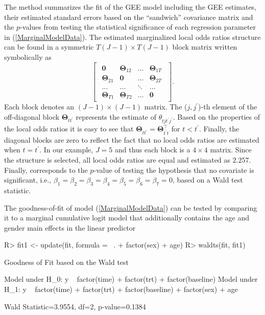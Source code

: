 \documentclass[
]{jss}
\begin{document}
The  method summarizes the fit of the GEE model including
the GEE estimates, their estimated standard errors based on the
``sandwich'' covariance matrix and the \(p\)-values from testing the
statistical significance of each regression parameter in
(\ref{MarginalModelData}). The estimated marginalized local odds ratios
structure can be found in a symmetric \(T(J-1) \times T(J-1)\) block
matrix written symbolically as \[\begin{bmatrix}
\begin{array}{cccc}
\mathbf 0                               &\boldsymbol{\Theta}_{12}                 &\ldots  &\boldsymbol{\Theta}_{1T} \\
\boldsymbol{\Theta}_{21}       &\mathbf 0                                &\ldots  &\boldsymbol{\Theta}_{2T} \\
\ldots                                  &\ldots                                   &\ddots  & \ldots          \\
\boldsymbol{\Theta}_{T1}       &\boldsymbol{\Theta}_{T2}        &\ldots  &\mathbf 0
\end{array}
\end{bmatrix}.\] Each block denotes an \((J-1) \times (J-1)\) matrix.
The (\(j,j^{\prime}\))-th element of the off-diagonal block
\(\boldsymbol{\Theta}_{tt^{\prime}}\) represents the estimate of
\(\theta_{tjt^{\prime}j^{\prime}}\). Based on the properties of the
local odds ratios it is easy to see that
\(\boldsymbol{\Theta}_{tt^{\prime}}=\boldsymbol{\Theta}^{\top}_{t^{\prime}t}\)
for \(t<t^{\prime}\). Finally, the diagonal blocks are zero to reflect
the fact that no local odds ratios are estimated when \(t=t^{\prime}\).
In our example, \(J=5\) and thus each block is a \(4 \times 4\) matrix.
Since the  structure is selected, all local odds ratios
are equal and estimated as \(2.257\). Finally,
 corresponds to the \(p\)-value of testing
the hypothesis that no covariate is significant, i.e.,
\(\beta_1=\beta_2=\beta_3=\beta_4 =\beta_5=\beta_6=\beta_7=0\), based on
a Wald test statistic.

The goodness-of-fit of model (\ref{MarginalModelData}) can be tested by
comparing it to a marginal cumulative logit model that additionally
contains the age and gender main effects in the linear predictor

\begin{CodeChunk}

\begin{CodeInput}
R> fit1 <- update(fit, formula = ~. + factor(sex) + age)
R> waldts(fit, fit1)
\end{CodeInput}

\begin{CodeOutput}
Goodness of Fit based on the Wald test 

Model under H_0: y ~ factor(time) + factor(trt) + factor(baseline)
Model under H_1: y ~ factor(time) + factor(trt) + factor(baseline) + factor(sex) + 
    age

Wald Statistic=3.9554, df=2, p-value=0.1384
\end{CodeOutput}
\end{CodeChunk}
\end{document}
